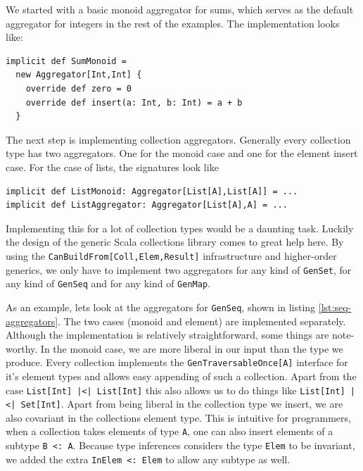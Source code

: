 \documentclass[10pt,a4paper]{article}
\begin{document}
We started with a basic monoid aggregator for sums, which serves as the default aggregator for integers in the rest of the examples. The implementation looks like:
\begin{lstlisting}
implicit def SumMonoid =
  new Aggregator[Int,Int] {
    override def zero = 0
    override def insert(a: Int, b: Int) = a + b
  }
\end{lstlisting}

The next step is implementing collection aggregators. Generally every collection type has two aggregators. One for the monoid case and one for the element insert case. For the case of lists, the signatures look like
\begin{lstlisting}
implicit def ListMonoid: Aggregator[List[A],List[A]] = ...
implicit def ListAggregator: Aggregator[List[A],A] = ...
\end{lstlisting}

Implementing this for a lot of collection types would be a daunting task. Luckily the design of the generic Scala collections library \citep{odersky2009fighting} comes to great help here. By using the \lstinline|CanBuildFrom[Coll,Elem,Result]| infrastructure and higher-order generics, we only have to implement two aggregators for any kind of \lstinline|GenSet|, for any kind of \lstinline|GenSeq| and for any kind of \lstinline|GenMap|.

As an example, lets look at the aggregators for \lstinline|GenSeq|, shown in listing \ref{lst:seq-aggregators}. The two cases (monoid and element) are implemented separately. Although the implementation is relatively straightforward, some things are note-worthy. In the monoid case, we are more liberal in our input than the type we produce. Every collection implements the \lstinline|GenTraversableOnce[A]| interface for it's element types and allows easy appending of such a collection. Apart from the case \lstinline!List[Int] |<| List[Int]! this also allows us to do things like \lstinline!List[Int] |<| Set[Int]!. Apart from being liberal in the collection type we insert, we are also covariant in the collections element type. This is intuitive for programmers, when a collection takes elements of type \lstinline|A|, one can also insert elements of a subtype \lstinline|B <: A|. Because type inferences considers the type \lstinline|Elem| to be invariant, we added the extra \lstinline|InElem <: Elem| to allow any subtype as well.
\end{document}
